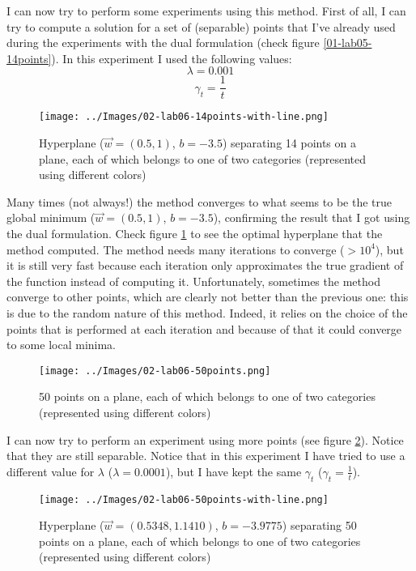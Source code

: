     I can now try to perform some experiments using this method. First of all, I can try to compute a solution for a set of (separable) points that I've already used during the experiments with the dual formulation (check figure \ref{01-lab05-14points}). In this experiment I used the following values:
    \[\lambda = 0.001\]
    \[\gamma_t = \frac{1}{t}\]
    \begin{figure}
        \centering
        \texttt{[image: ../Images/02-lab06-14points-with-line.png]}
        \caption{Hyperplane (\(\vec{w} = (0.5, 1)\), \(b=-3.5\)) separating 14 points on a plane, each of which belongs to one of two categories (represented using different colors)}
        \label{02-lab06-14points-with-line}
    \end{figure}
    Many times (not always!) the method converges to what seems to be the true global minimum (\(\vec{w} = (0.5, 1)\), \(b=-3.5\)), confirming the result that I got using the dual formulation. Check figure \ref{02-lab06-14points-with-line} to see the optimal hyperplane that the method computed. The method needs many iterations to converge (\(>10^4\)), but it is still very fast because each iteration only approximates the true gradient of the function instead of computing it. Unfortunately, sometimes the method converge to other points, which are clearly not better than the previous one: this is due to the random nature of this method. Indeed, it relies on the choice of the points that is performed at each iteration and because of that it could converge to some local minima.\par
    \begin{figure}
        \centering
        \texttt{[image: ../Images/02-lab06-50points.png]}
        \caption{50 points on a plane, each of which belongs to one of two categories (represented using different colors)}
        \label{02-lab06-50points}
    \end{figure}
    I can now try to perform an experiment using more points (see figure \ref{02-lab06-50points}). Notice that they are still separable. Notice that in this experiment I have tried to use a different value for \(\lambda\) (\(\lambda = 0.0001\)), but I have kept the same \(\gamma_t\) (\(\gamma_t = \frac{1}{t}\)).
    \begin{figure}
        \centering
        \texttt{[image: ../Images/02-lab06-50points-with-line.png]}
        \caption{Hyperplane (\(\vec{w} = (0.5348, 1.1410)\), \(b=-3.9775\)) separating 50 points on a plane, each of which belongs to one of two categories (represented using different colors)}
        \label{02-lab06-50points-with-line}
    \end{figure}
